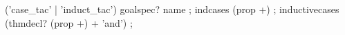 \begin{isabellebody}
\begin{isamarkuptext}
  \begin{rail}
    ('case\_tac' | 'induct\_tac') goalspec? name
    ;
    indcases (prop +)
    ;
    inductivecases (thmdecl? (prop +) + 'and')
    ;
  \end{rail}%
\end{isamarkuptext}%
\isamarkuptrue%
%
\isadelimtheory
%
\endisadelimtheory
%
\isatagtheory
{}\isamarkupfalse%
%
\endisatagtheory
{\isafoldtheory}%
%
\isadelimtheory
%
\endisadelimtheory
\isanewline
\end{isabellebody}%
